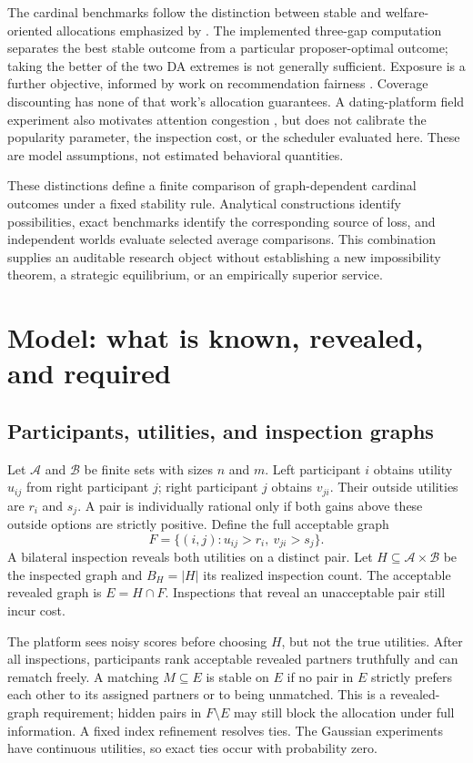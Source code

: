 \documentclass[11pt,a4paper]{article}
\begin{document}
The cardinal benchmarks follow the distinction between stable and welfare-oriented allocations emphasized by \citet{E10,E11}. The implemented three-gap computation separates the best stable outcome from a particular proposer-optimal outcome; taking the better of the two DA extremes is not generally sufficient. Exposure is a further objective, informed by work on recommendation fairness \citep{E06}. Coverage discounting has none of that work's allocation guarantees. A dating-platform field experiment also motivates attention congestion \citep{E07}, but does not calibrate the popularity parameter, the inspection cost, or the scheduler evaluated here. These are model assumptions, not estimated behavioral quantities.

These distinctions define a finite comparison of graph-dependent cardinal outcomes under a fixed stability rule. Analytical constructions identify possibilities, exact benchmarks identify the corresponding source of loss, and independent worlds evaluate selected average comparisons. This combination supplies an auditable research object without establishing a new impossibility theorem, a strategic equilibrium, or an empirically superior service.

\section{Model: what is known, revealed, and required}\label{sec:model}
\subsection{Participants, utilities, and inspection graphs}
Let $\mathcal A$ and $\mathcal B$ be finite sets with sizes $n$ and $m$. Left participant $i$ obtains utility $u_{ij}$ from right participant $j$; right participant $j$ obtains $v_{ji}$. Their outside utilities are $r_i$ and $s_j$. A pair is individually rational only if both gains above these outside options are strictly positive. Define the full acceptable graph
\begin{equation}
F=\{(i,j):u_{ij}>r_i,\ v_{ji}>s_j\}.
\end{equation}
A bilateral inspection reveals both utilities on a distinct pair. Let $H\subseteq\mathcal A\times\mathcal B$ be the inspected graph and $B_H=|H|$ its realized inspection count. The acceptable revealed graph is $E=H\cap F$. Inspections that reveal an unacceptable pair still incur cost.

The platform sees noisy scores before choosing $H$, but not the true utilities. After all inspections, participants rank acceptable revealed partners truthfully and can rematch freely. A matching $M\subseteq E$ is stable on $E$ if no pair in $E$ strictly prefers each other to its assigned partners or to being unmatched. This is a revealed-graph requirement; hidden pairs in $F\setminus E$ may still block the allocation under full information. A fixed index refinement resolves ties. The Gaussian experiments have continuous utilities, so exact ties occur with probability zero.
\end{document}
